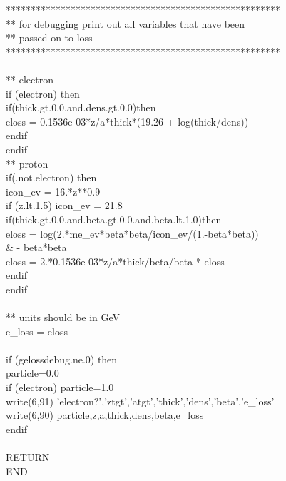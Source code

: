 {*******************************************************\\
** for debugging print out all variables that have been \\
** passed on to loss\\
*******************************************************\\
 \\
** electron\\
      if (electron) then\\
        if(thick.gt.0.0.and.dens.gt.0.0)then\\
            eloss = 0.1536e-03*z/a*thick*(19.26 + log(thick/dens))\\
         endif\\
      endif\\
** proton\\
      if(.not.electron) then\\
         icon\_ev = 16.*z**0.9\\
         if (z.lt.1.5) icon\_ev = 21.8\\
         if(thick.gt.0.0.and.beta.gt.0.0.and.beta.lt.1.0)then\\
          eloss = log(2.*me\_ev*beta*beta/icon\_ev/(1.-beta*beta))\\
     \&                - beta*beta\\
          eloss = 2.*0.1536e-03*z/a*thick/beta/beta * eloss\\
         endif\\
      endif\\
 \\
** units should be in GeV\\
      e\_loss = eloss\\
 \\
      if (gelossdebug.ne.0) then\\
         particle=0.0\\
         if (electron) particle=1.0\\
         write(6,91) 'electron?','ztgt','atgt','thick','dens','beta','e\_loss'\\
         write(6,90) particle,z,a,thick,dens,beta,e\_loss\\
      endif\\
 \\
      RETURN\\
      END\\
 \\
 \\
}

